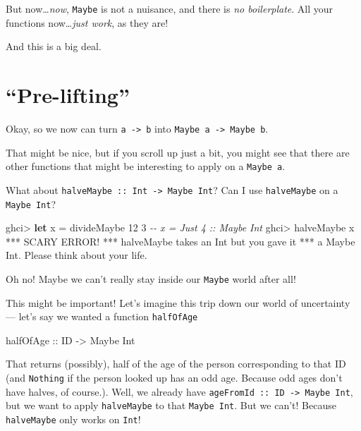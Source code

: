 \documentclass[]{article}
\newenvironment{Shaded}{}{}
\newcommand{\CommentTok}[1]{\textcolor[rgb]{0.38,0.63,0.69}{\textit{#1}}}
\newcommand{\DataTypeTok}[1]{\textcolor[rgb]{0.56,0.13,0.00}{#1}}
\newcommand{\DecValTok}[1]{\textcolor[rgb]{0.25,0.63,0.44}{#1}}
\newcommand{\KeywordTok}[1]{\textcolor[rgb]{0.00,0.44,0.13}{\textbf{#1}}}
\newcommand{\NormalTok}[1]{#1}
\newcommand{\OperatorTok}[1]{\textcolor[rgb]{0.40,0.40,0.40}{#1}}
\newcommand{\OtherTok}[1]{\textcolor[rgb]{0.00,0.44,0.13}{#1}}
\begin{document}
But now\ldots{}\emph{now}, \texttt{Maybe} is not a nuisance, and there is
\emph{no boilerplate}. All your functions now\ldots{}\emph{just work}, as they
are!

And this is a big deal.

\section{``Pre-lifting''}\label{pre-lifting}

Okay, so we now can turn \texttt{a\ -\textgreater{}\ b} into
\texttt{Maybe\ a\ -\textgreater{}\ Maybe\ b}.

That might be nice, but if you scroll up just a bit, you might see that there
are other functions that might be interesting to apply on a \texttt{Maybe\ a}.

What about \texttt{halveMaybe\ ::\ Int\ -\textgreater{}\ Maybe\ Int}? Can I use
\texttt{halveMaybe} on a \texttt{Maybe\ Int}?

\begin{Shaded}
\begin{Highlighting}[]
\NormalTok{ghci}\OperatorTok{\textgreater{}} \KeywordTok{let}\NormalTok{ x }\OtherTok{=}\NormalTok{ divideMaybe }\DecValTok{12} \DecValTok{3}     \CommentTok{{-}{-} x = Just 4 :: Maybe Int}
\NormalTok{ghci}\OperatorTok{\textgreater{}}\NormalTok{ halveMaybe x}
\OperatorTok{***} \DataTypeTok{SCARY} \DataTypeTok{ERROR}\OperatorTok{!}
\OperatorTok{***}\NormalTok{ halveMaybe takes an }\DataTypeTok{Int}\NormalTok{ but you gave it}
\OperatorTok{***}\NormalTok{ a }\DataTypeTok{Maybe} \DataTypeTok{Int}\OperatorTok{.}  \DataTypeTok{Please}\NormalTok{ think about your life}\OperatorTok{.}
\end{Highlighting}
\end{Shaded}

Oh no! Maybe we can't really stay inside our \texttt{Maybe} world after all!

This might be important! Let's imagine this trip down our world of uncertainty
--- let's say we wanted a function \texttt{halfOfAge}

\begin{Shaded}
\begin{Highlighting}[]
\OtherTok{halfOfAge ::} \DataTypeTok{ID} \OtherTok{{-}\textgreater{}} \DataTypeTok{Maybe} \DataTypeTok{Int}
\end{Highlighting}
\end{Shaded}

That returns (possibly), half of the age of the person corresponding to that ID
(and \texttt{Nothing} if the person looked up has an odd age. Because odd ages
don't have halves, of course.). Well, we already have
\texttt{ageFromId\ ::\ ID\ -\textgreater{}\ Maybe\ Int}, but we want to apply
\texttt{halveMaybe} to that \texttt{Maybe\ Int}. But we can't! Because
\texttt{halveMaybe} only works on \texttt{Int}!
\end{document}
